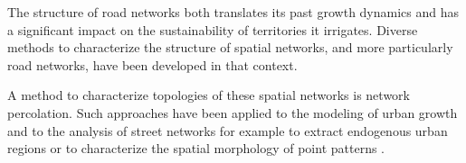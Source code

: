 \documentclass{jimis-en}
\begin{document}
The structure of road networks both translates its past growth dynamics and has a significant impact on the sustainability of territories it irrigates. Diverse methods to characterize the structure of spatial networks, and more particularly road networks, have been developed in that context.









A method to characterize topologies of these spatial networks is network percolation. Such approaches have been applied to the modeling of urban growth \citep{makse1998modeling} and to the analysis of street networks for example to extract endogenous urban regions \citep{arcaute2016cities} or to characterize the spatial morphology of point patterns \cite{huynh2018characterisation}.



\end{document}
